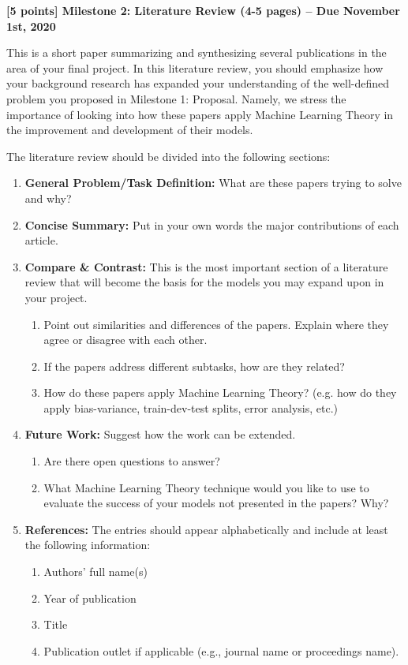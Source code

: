 \clearpage

\large
\textbf{[5 points] Milestone 2: Literature Review (4-5 pages) -- Due November 1st, 2020}


\normalsize
This is a short paper summarizing and synthesizing several publications in the area of your final project. In this literature review, you should emphasize how your background research has expanded your understanding of the well-defined problem you proposed in Milestone 1: Proposal. Namely, we stress the importance of looking into how these papers apply Machine Learning Theory in the improvement and development of their models.\vspace{\baselineskip}

The literature review should be divided into the following sections:

\begin{enumerate}
    \item \textbf{General Problem/Task Definition:} What are these papers trying to solve and why?
    \item \textbf{Concise Summary:} Put in your own words the major contributions of each article.
    \item \textbf{Compare \& Contrast:} This is the most important section of a literature review that will become the basis for the models you may expand upon in your project.
    \begin{enumerate}
        \item Point out similarities and differences of the papers.  Explain where they agree or disagree with each other.
        \item If the papers address different subtasks, how are they related?
        \item How do these papers apply Machine Learning Theory? (e.g. how do they apply bias-variance, train-dev-test splits, error analysis, etc.)
    \end{enumerate}
    \item \textbf{Future Work:} Suggest how the work can be extended.
    \begin{enumerate}
        \item Are there open questions to answer?
        \item What Machine Learning Theory technique would you like to use to evaluate the success of your models not presented in the papers? Why?
    \end{enumerate}
    \item \textbf{References:} The entries should appear alphabetically and include at least the following information:
    \begin{enumerate}
        \item Authors’ full name(s)
        \item Year of publication
        \item Title
        \item Publication outlet if applicable (e.g., journal name or proceedings name).
    \end{enumerate}
\end{enumerate}


